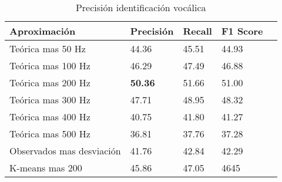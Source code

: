 \begin{table}[H]
\centering
\caption{Precisión identificación vocálica}
\label{tab:resultados_vocales}
\begin{tabular}{|l|l|l|l|l|}
\hline
Aproximación              & Precisión & Recall & F1 Score \\ \hline
Teórica mas 50 Hz         & 44.36     & 45.51  & 44.93    \\ \hline
Teórica mas 100 Hz        & 46.29     & 47.49  & 46.88    \\ \hline
Teórica mas 200 Hz        & \textbf{50.36}     & 51.66  & 51.00    \\ \hline
Teórica mas 300 Hz        & 47.71     & 48.95  & 48.32    \\ \hline
Teórica mas 400 Hz        & 40.75     & 41.80  & 41.27    \\ \hline
Teórica mas 500 Hz        & 36.81     & 37.76  & 37.28    \\ \hline
Observados mas desviación & 41.76     & 42.84  & 42.29    \\ \hline
K-means mas 200           & 45.86     & 47.05  & 4645     \\ \hline
\end{tabular}

\end{table}